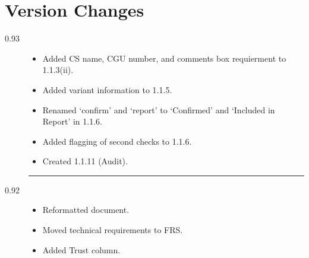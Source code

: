 \documentclass[a4paper, 10pt]{article}
\begin{document}
\section{Version Changes}
\begin{description}
            \item [0.93] \begin{itemize}
                                \renewcommand\labelitemi{--}
                                        \item Added CS name, CGU number, and comments box requierment to 1.1.3(ii).
                                                    \item Added variant information to 1.1.5.
                                                                \item Renamed `confirm' and `report' to `Confirmed' and `Included in Report' in 1.1.6.
                                                                            \item Added flagging of second checks to 1.1.6.
                                                                                        \item Created 1.1.11 (Audit).
                                                                                                \end{itemize}
                                                                                                    \rule{\textwidth}{1pt}
                                                                                                        \item [0.92] \begin{itemize}
                                                                                                                            \renewcommand\labelitemi{--}
                                                                                                                                    \item Reformatted document.
                                                                                                                                                \item Moved technical requirements to FRS.
                                                                                                                                                            \item Added Trust column.
                                                                                                                                                                    \end{itemize}

\end{description}
\end{document}

